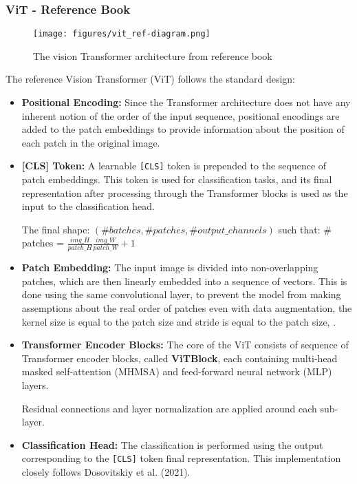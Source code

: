 \subsubsection{ViT - Reference Book}
\begin{figure}[h!]
    \centering
    \texttt{[image: figures/vit\_ref-diagram.png]}
    \caption{The vision Transformer architecture from reference book}
    \label{fig:enter-label}
\end{figure}
The reference Vision Transformer (ViT) follows the standard design:
\begin{itemize}
      \item \textbf{Positional Encoding:} Since the Transformer architecture does not have any inherent notion of the order of the input sequence, positional encodings are added to the patch embeddings to provide information about the position of each patch in the original image.
      \item \textbf{[CLS] Token:} A learnable \texttt{[CLS]} token is prepended to the sequence of patch embeddings. This token is used for classification tasks, and its final representation after processing through the Transformer blocks is used as the input to the classification head.
      
      The final shape: $(\#batches, \#patches, \#output\_channels)$
      such that:
      $\#$patches = $ \frac{img\_H}{patch\_H} \frac{img\_W}{patch\_W} + 1$
      \item \textbf{Patch Embedding:} The input image is divided into non-overlapping patches, which are then linearly embedded into a sequence of vectors. This is done using the same convolutional layer, to prevent the model from making assemptions about the real order of patches even with data augmentation, the kernel size is equal to the patch size and stride is equal to the patch size, .
      \item \textbf{Transformer Encoder Blocks:} The core of the ViT consists of sequence of Transformer encoder blocks, called  \textbf{ViTBlock}, each containing multi-head masked self-attention (MHMSA) and feed-forward neural network (MLP) layers.
      
      Residual connections and layer normalization are applied around each sub-layer.
      \item \textbf{Classification Head:} The classification is performed using the output corresponding to the \texttt{[CLS]} token final representation. This implementation closely follows Dosovitskiy et al. (2021).
\end{itemize}

